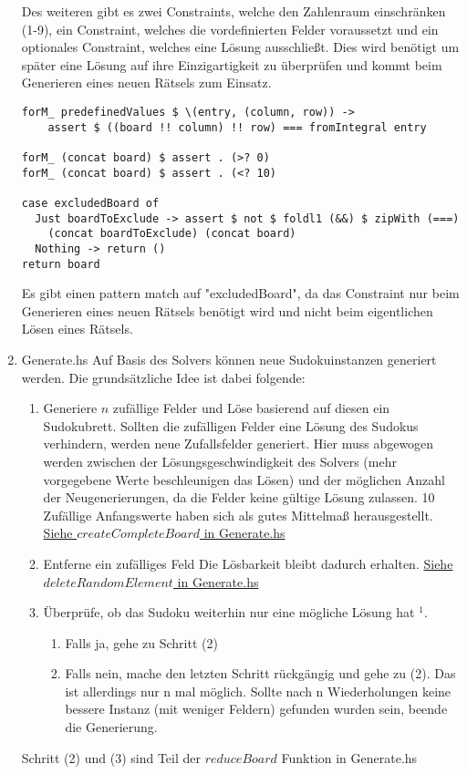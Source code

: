 \begin{enumerate}[(1)]
    Des weiteren gibt es zwei Constraints, welche den Zahlenraum einschränken (1-9), ein Constraint, welches die vordefinierten Felder voraussetzt und ein optionales Constraint, welches eine Lösung ausschließt. Dies wird benötigt um später eine Lösung auf ihre Einzigartigkeit zu überprüfen und kommt beim Generieren eines neuen Rätsels zum Einsatz.
    \begin{lstlisting}
forM_ predefinedValues $ \(entry, (column, row)) ->
    assert $ ((board !! column) !! row) === fromIntegral entry

forM_ (concat board) $ assert . (>? 0)
forM_ (concat board) $ assert . (<? 10)

case excludedBoard of
  Just boardToExclude -> assert $ not $ foldl1 (&&) $ zipWith (===)
    (concat boardToExclude) (concat board)
  Nothing -> return ()
return board
    \end{lstlisting}
    Es gibt einen pattern match auf "excludedBoard", da das Constraint nur beim Generieren eines neuen Rätsels benötigt wird und nicht beim eigentlichen Lösen eines Rätsels. \newline
    \item Generate.hs \newline
    Auf Basis des Solvers können neue Sudokuinstanzen generiert werden. Die grundsätzliche Idee ist dabei folgende:
        \begin{enumerate}[(1)]
            \item Generiere \(n\) zufällige Felder und Löse basierend auf diesen ein Sudokubrett. \newline
            Sollten die zufälligen Felder eine Lösung des Sudokus verhindern, werden neue Zufallsfelder generiert. Hier muss abgewogen werden zwischen der Lösungsgeschwindigkeit des Solvers (mehr vorgegebene Werte beschleunigen das Lösen) und der möglichen Anzahl der Neugenerierungen, da die Felder keine gültige Lösung zulassen. 10 Zufällige Anfangswerte haben sich als gutes Mittelmaß herausgestellt. \newline
            \underline{Siehe \(createCompleteBoard\) in Generate.hs}
            \item Entferne ein zufälliges Feld \newline
            Die Lösbarkeit bleibt dadurch erhalten. \newline
            \underline{Siehe \(deleteRandomElement\) in Generate.hs}
            \item Überprüfe, ob das Sudoku weiterhin nur eine mögliche Lösung hat $^1$.
            \begin{enumerate}
                \item Falls ja, gehe zu Schritt (2)
                \item Falls nein, mache den letzten Schritt rückgängig und gehe zu (2). \newline
                Das ist allerdings nur n mal möglich. Sollte nach n Wiederholungen keine bessere Instanz (mit weniger Feldern) gefunden wurden sein, beende die Generierung.
            \end{enumerate}
        \end{enumerate}
        Schritt (2) und (3) sind Teil der \(reduceBoard\) Funktion in Generate.hs
\end{enumerate}
